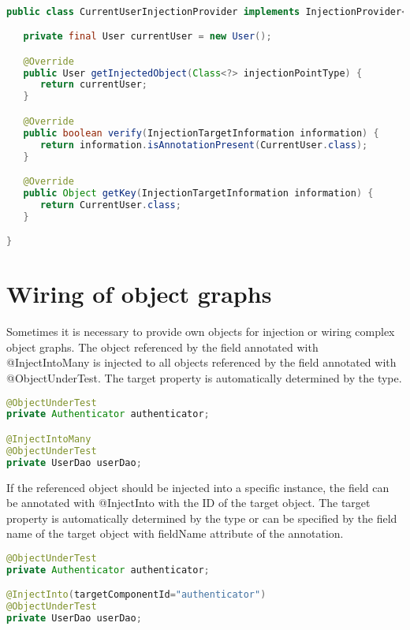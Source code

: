 \begin{lstlisting}[language={JAVA},caption=javax.inject.Qualifier Injection Provider]

public class CurrentUserInjectionProvider implements InjectionProvider<User> {

   private final User currentUser = new User();

   @Override
   public User getInjectedObject(Class<?> injectionPointType) {
      return currentUser;
   }

   @Override
   public boolean verify(InjectionTargetInformation information) {
      return information.isAnnotationPresent(CurrentUser.class);
   }

   @Override
   public Object getKey(InjectionTargetInformation information) {
      return CurrentUser.class;
   }

}
\end{lstlisting}


\section{Wiring of object graphs}
\label{sec:Wiring of object graphs}

Sometimes it is necessary to provide own objects for injection or wiring complex object graphs. The object referenced by the field annotated with @InjectIntoMany is injected to all objects referenced by the field annotated with @ObjectUnderTest.
The target property is automatically determined by the type.

\begin{lstlisting}[language={JAVA},caption=InjectIntoMany]
@ObjectUnderTest
private Authenticator authenticator;

@InjectIntoMany
@ObjectUnderTest
private UserDao userDao;
\end{lstlisting}

If the referenced object should be injected into a specific instance, the field can be annotated with @InjectInto with the ID of the target object.
The target property is automatically determined by the type or can be specified by the field name of the target object with fieldName attribute of the annotation.

\begin{lstlisting}[language={JAVA},caption=InjectInto]
@ObjectUnderTest
private Authenticator authenticator;

@InjectInto(targetComponentId="authenticator")
@ObjectUnderTest
private UserDao userDao;
\end{lstlisting}





